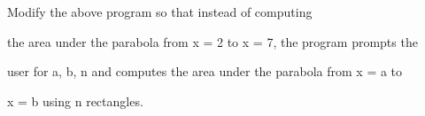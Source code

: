  Modify the above program so that instead of computing

the area under the parabola from x = 2 to x = 7, the program prompts the

user for a, b, n and computes the area under the parabola from x = a to

x = b using n rectangles.

